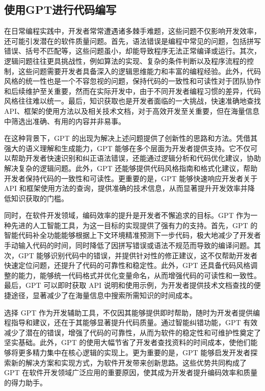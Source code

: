 \subsection{使用GPT进行代码编写}

在日常编程实践中，开发者常常遭遇诸多棘手难题，这些问题不仅影响开发效率，还可能引发潜在的软件质量问题。首先，语法错误是编程中常见的问题，包括拼写错误、括号不匹配等，这些问题虽小，却能导致程序无法正常编译或运行。其次，逻辑问题往往更具挑战性，例如算法的实现、复杂的条件判断以及程序流程的控制，这些问题需要开发者具备深入的逻辑思维能力和丰富的编程经验。此外，代码风格的统一性也是一个不容忽视的问题，保持代码的一致性和可读性对于团队协作和后续维护至关重要，然而在实际开发中，由于不同开发者编程习惯的差异，代码风格往往难以统一。最后，知识获取也是开发者面临的一大挑战，快速准确地查找 API、框架的使用方法以及相关技术文档，对于高效开发至关重要，但在海量信息中筛选出准确、有用的内容并非易事。

在这种背景下，GPT 的出现为解决上述问题提供了创新性的思路和方法。凭借其强大的语义理解和生成能力，GPT 能够在多个层面为开发者提供支持。它不仅可以帮助开发者快速识别和纠正语法错误，还能通过逻辑分析和代码优化建议，协助解决复杂的逻辑问题。此外，GPT 还能够提供代码风格指南和格式化建议，帮助开发者保持代码的一致性和可读性。更重要的是，GPT 能够快速响应开发者关于 API 和框架使用方法的查询，提供准确的技术信息，从而显著提升开发效率并降低知识获取的门槛。

同时，在软件开发领域，编码效率的提升是开发者不懈追求的目标。GPT 作为一种先进的人工智能工具，为这一目标的实现提供了强有力的支持。首先，GPT 的智能代码补全功能能够根据上下文环境精准预测下一步代码，极大地减少了开发者手动输入代码的时间，同时降低了因拼写错误或语法不规范而导致的编译问题。其次，GPT 能够识别代码中的错误，并提供针对性的修正建议，这不仅帮助开发者快速定位问题，还提升了代码的可靠性和稳定性。此外，GPT 还具备代码风格调整的能力，能够统一代码格式并优化变量命名，从而增强代码的可读性和一致性。最后，GPT 可以即时获取 API 说明和使用示例，为开发者提供技术文档查找的便捷途径，显著减少了在海量信息中搜索所需知识的时间成本。

选择 GPT 作为开发辅助工具，不仅因其能够提供即时帮助，随时为开发者提供编程指导和建议，还在于其能够显著提升代码质量。通过智能纠错功能，GPT 有效减少了潜在的错误，增强了代码的可靠性，从而为软件的稳定性和可维护性奠定了坚实基础。此外，GPT 的使用大幅节省了开发者查找资料的时间成本，使他们能够将更多精力集中在核心逻辑的实现上。更为重要的是，GPT 能够启发开发者探索新的解决方案和实现方式，为软件开发带来创新思路。这些优势共同构成了 GPT 在软件开发领域广泛应用的重要原因，使其成为开发者提升编码效率和质量的得力助手。

